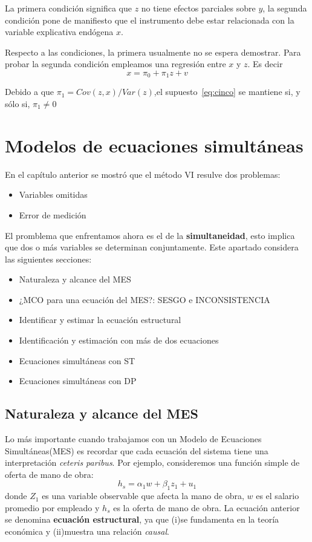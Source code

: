 \documentclass[a4paper,11pt]{book}
\begin{document}
La primera condición significa que $z$ no tiene efectos parciales sobre $y$, la segunda condición pone de manifiesto que el instrumento debe estar relacionada con la variable explicativa endógena $x$.

Respecto a las condiciones, la primera usualmente no se espera demostrar. Para probar la segunda condición empleamos una regresión entre $x$ y $z$. Es decir
\begin{equation}
\label{eq:seis}
x = \pi_{0} + \pi_{1}z + v
\end{equation}

Debido a que $\pi_{1} = Cov(z,x) / Var(z)$,el supuesto~\ref{eq:cinco} se mantiene si, y sólo si, $\pi_{1} \not = 0$




\chapter{Modelos de ecuaciones simultáneas}
En el capítulo anterior se mostró que el método VI resulve dos problemas:

\begin{itemize}
	\item Variables omitidas
	\item Error de medición
\end{itemize}
El promblema que enfrentamos ahora es el de la \textbf{simultaneidad}, esto implica que dos o más variables se determinan conjuntamente.
Este apartado considera las siguientes secciones:
\begin{itemize}
	\item Naturaleza y alcance del MES
	\item ¿MCO para una ecuación del MES?: SESGO e INCONSISTENCIA
	\item Identificar y estimar la ecuación estructural
	\item Identificación y estimación con más de dos ecuaciones
	\item Ecuaciones simultáneas con ST
	\item Ecuaciones simultáneas con DP
\end{itemize}

\section{Naturaleza y alcance del MES}
Lo más importante cuando trabajamos con un Modelo de Ecuaciones Simultáneas(MES) es recordar que cada ecuación del sistema tiene una interpretación \textit{ceteris paribus}. Por ejemplo, consideremos una función simple de oferta de mano de obra:
\begin{equation}\label{eq:mh}
h_{s} = \alpha_{1}w + \beta_{1}z_{1} + u_{1}
\end{equation}
donde $Z_{1}$ es una variable observable que afecta la mano de obra, $w$ es el salario promedio por empleado y $h_{s}$ es la oferta de mano de obra. La ecuación anterior se denomina \textbf{ecuación estructural}, ya que (i)se fundamenta en la teoría económica y (ii)muestra una relación \textit{causal}.\\
\end{document}
